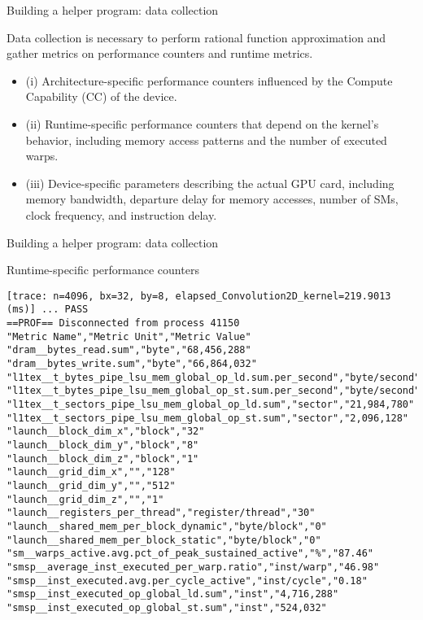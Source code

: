 \begin{frame}{Building a helper program: data collection}
    \begin{block}{}
        Data collection is necessary to perform rational function approximation and gather metrics on performance 
        counters and runtime metrics.
        \begin{itemize}
            \item (i) Architecture-specific performance counters influenced by the Compute Capability (CC) of the device.
            \item (ii) Runtime-specific performance counters that depend on the kernel's behavior, including memory access 
            patterns and the number of executed warps.
            \item (iii) Device-specific parameters describing the actual GPU card, including memory bandwidth, departure delay for 
            memory accesses, number of SMs, clock frequency, and instruction delay.
        \end{itemize}
    \end{block}
\end{frame}

\begin{frame}[fragile]{Building a helper program: data collection}
    \begin{block}{Runtime-specific performance counters}
        {
            \begin{tcolorbox}
                \scriptsize
                \begin{verbatim}
[trace: n=4096, bx=32, by=8, elapsed_Convolution2D_kernel=219.9013 (ms)] ... PASS
==PROF== Disconnected from process 41150
"Metric Name","Metric Unit","Metric Value"
"dram__bytes_read.sum","byte","68,456,288"
"dram__bytes_write.sum","byte","66,864,032"
"l1tex__t_bytes_pipe_lsu_mem_global_op_ld.sum.per_second","byte/second","1,293,146,285,512.62"
"l1tex__t_bytes_pipe_lsu_mem_global_op_st.sum.per_second","byte/second","123,294,394,447.39"
"l1tex__t_sectors_pipe_lsu_mem_global_op_ld.sum","sector","21,984,780"
"l1tex__t_sectors_pipe_lsu_mem_global_op_st.sum","sector","2,096,128"
"launch__block_dim_x","block","32"
"launch__block_dim_y","block","8"
"launch__block_dim_z","block","1"
"launch__grid_dim_x","","128"
"launch__grid_dim_y","","512"
"launch__grid_dim_z","","1"
"launch__registers_per_thread","register/thread","30"
"launch__shared_mem_per_block_dynamic","byte/block","0"
"launch__shared_mem_per_block_static","byte/block","0"
"sm__warps_active.avg.pct_of_peak_sustained_active","%","87.46"
"smsp__average_inst_executed_per_warp.ratio","inst/warp","46.98"
"smsp__inst_executed.avg.per_cycle_active","inst/cycle","0.18"
"smsp__inst_executed_op_global_ld.sum","inst","4,716,288"
"smsp__inst_executed_op_global_st.sum","inst","524,032"
\end{verbatim}
\end{tcolorbox}
        }
    \end{block}
\end{frame}

